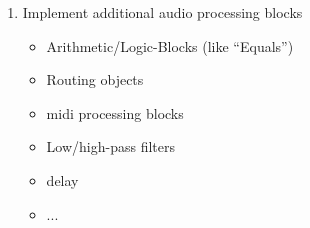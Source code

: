 	\begin{enumerate}
		\item Implement additional audio processing blocks
		\begin{itemize}
			\item Arithmetic/Logic-Blocks (like "`Equals"')
			\item Routing objects
			\item midi processing blocks
			\item Low/high-pass filters
			\item delay
			\item ...
		\end{itemize}
	\end{enumerate}
	

